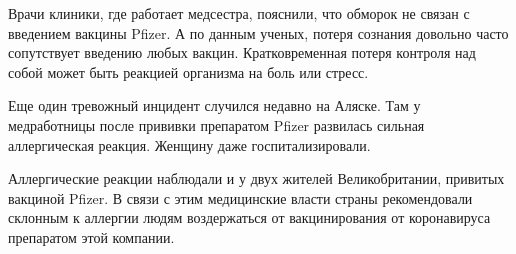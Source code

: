 Врачи клиники, где работает медсестра, пояснили, что обморок не связан с
введением вакцины Pfizer. А по данным ученых, потеря сознания довольно часто
сопутствует введению любых вакцин. Кратковременная потеря контроля над собой
может быть реакцией организма на боль или стресс.


Еще один тревожный инцидент случился недавно на Аляске. Там у медработницы
после прививки препаратом Pfizer развилась сильная аллергическая реакция.
Женщину даже госпитализировали.

Аллергические реакции наблюдали и у двух жителей Великобритании, привитых
вакциной Pfizer. В связи с этим медицинские власти страны рекомендовали
склонным к аллергии людям воздержаться от вакцинирования от коронавируса
препаратом этой компании.
